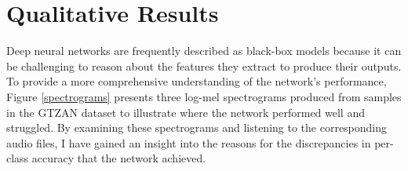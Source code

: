 \documentclass[conference]{IEEEtran}
\begin{document}
\section{Qualitative Results}

Deep neural networks are frequently described as black-box models because it can be challenging to reason about the features they extract to produce their outputs.
To provide a more comprehensive understanding of the network's performance, Figure \ref{spectrograms} presents three log-mel spectrograms produced from samples in the GTZAN dataset to illustrate where the network performed well and struggled.
By examining these spectrograms and listening to the corresponding audio files, I have gained an insight into the reasons for the discrepancies in per-class accuracy that the network achieved.
\end{document}
